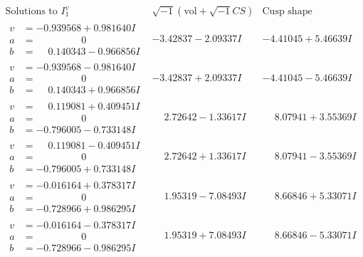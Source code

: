 \documentclass[1p]{elsarticle_modified}
\theoremstyle{definition}
\newcommand{\I}{\sqrt{-1}}
\begin{document}
$$\begin{array}{c|c|c}  
\text{Solutions to }I^v_{1}& \I (\text{vol} + \sqrt{-1}CS) & \text{Cusp shape}\\
 \hline 
\begin{aligned}
v &= -0.939568 + 0.981640 I \\
a &= \phantom{-0.000000 } 0 \\
b &= \phantom{-}0.140343 - 0.966856 I\end{aligned}
 & -3.42837 - 2.09337 I & -4.41045 + 5.46639 I \\ \hline\begin{aligned}
v &= -0.939568 - 0.981640 I \\
a &= \phantom{-0.000000 } 0 \\
b &= \phantom{-}0.140343 + 0.966856 I\end{aligned}
 & -3.42837 + 2.09337 I & -4.41045 - 5.46639 I \\ \hline\begin{aligned}
v &= \phantom{-}0.119081 + 0.409451 I \\
a &= \phantom{-0.000000 } 0 \\
b &= -0.796005 - 0.733148 I\end{aligned}
 & \phantom{-}2.72642 - 1.33617 I & \phantom{-}8.07941 + 3.55369 I \\ \hline\begin{aligned}
v &= \phantom{-}0.119081 - 0.409451 I \\
a &= \phantom{-0.000000 } 0 \\
b &= -0.796005 + 0.733148 I\end{aligned}
 & \phantom{-}2.72642 + 1.33617 I & \phantom{-}8.07941 - 3.55369 I \\ \hline\begin{aligned}
v &= -0.016164 + 0.378317 I \\
a &= \phantom{-0.000000 } 0 \\
b &= -0.728966 + 0.986295 I\end{aligned}
 & \phantom{-}1.95319 - 7.08493 I & \phantom{-}8.66846 + 5.33071 I \\ \hline\begin{aligned}
v &= -0.016164 - 0.378317 I \\
a &= \phantom{-0.000000 } 0 \\
b &= -0.728966 - 0.986295 I\end{aligned}
 & \phantom{-}1.95319 + 7.08493 I & \phantom{-}8.66846 - 5.33071 I \\ \hline\begin{aligned}

\end{aligned}
\end{array}$$
\end{document}
